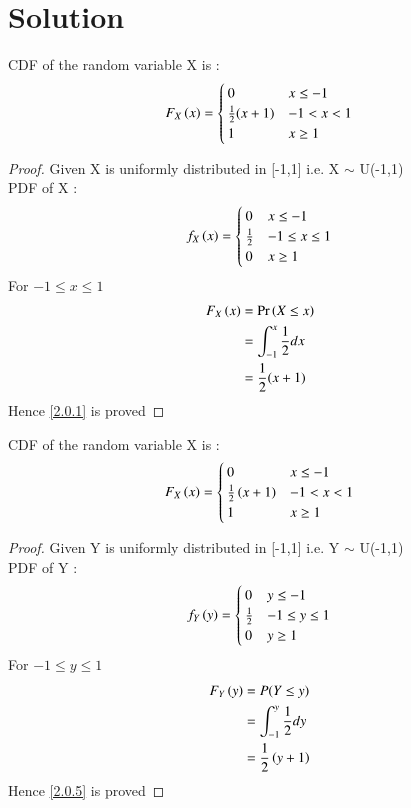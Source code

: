 \documentclass[journal,12pt,twocolumn]{IEEEtran}
\begin{document}
\section{Solution}
\begin{lemma}
 CDF of the random variable X is : 
 \begin{equation}
    F_X\left(x\right)=
    \begin{cases}
    0 & x\leq-1\\
    \frac{1}{2}(x+1) & -1<x<1\\
    1 & x\geq1 
    \end{cases}\label{2.0.1}
 \end{equation}
\end{lemma}
\begin{proof}
Given X is uniformly distributed in [-1,1] i.e. X \(\sim\) U(-1,1)
\\PDF of X : 
\begin{equation}
    f_{X}\left(x\right)=
    \begin{cases}
     0 & x\leq-1\\
     \frac{1}{2} & -1\leq x\leq 1\\
     0 & x\geq1
    \end{cases}
\end{equation}
For  \(-1\leq x\leq 1\)
\begin{align}
  F_{X}\left(x\right)&=\Pr\left(X\leq x\right)\\
  &=\int_{-1}^x\frac{1}{2}dx\\
  &=\frac{1}{2}(x+1)
\end{align}
Hence \eqref{2.0.1} is proved
\end{proof}
\begin{lemma}
 CDF of the random variable X is : 
 \begin{equation}
    F_X\left(x\right)=
    \begin{cases}
    0 & x\leq-1\\
    \frac{1}{2}\left(x+1\right) & -1<x<1\\
    1 & x\geq1 
    \end{cases}\label{2.0.5}
 \end{equation}
\end{lemma}
\begin{proof}
Given Y is uniformly distributed in [-1,1] i.e. Y \(\sim\) U(-1,1)
\\PDF of Y : 
\begin{equation}
    f_{Y}\left(y\right)=
    \begin{cases}
     0 & y\leq-1\\
     \frac{1}{2} & -1\leq y\leq 1\\
     0 & y\geq1
    \end{cases}
\end{equation}
For  \(-1\leq y\leq 1\)
\begin{align}
  F_{Y}\left(y\right)&=P(Y\leq y)\\
  &=\int_{-1}^y\frac{1}{2}dy\\
  &=\frac{1}{2}\left(y+1\right)
\end{align}
Hence \eqref{2.0.5} is proved
\end{proof}
\end{document}
